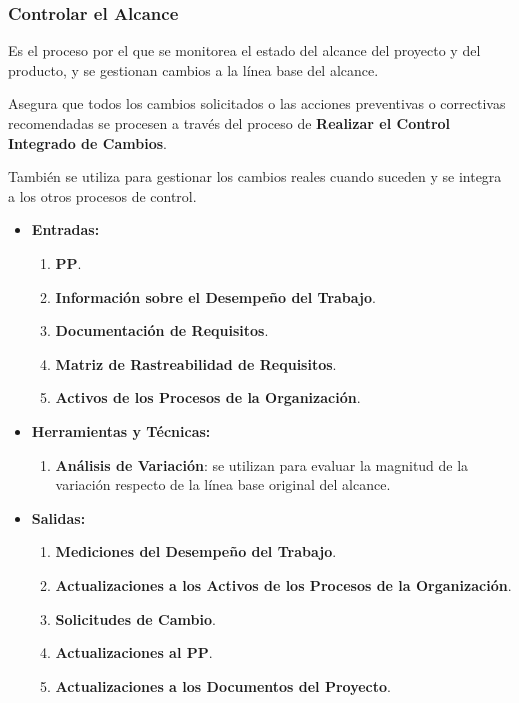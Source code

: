 \documentclass[10pt,a4paper]{article}
\begin{document}
\subsubsection{Controlar el Alcance}

Es el proceso por el que se monitorea el estado del alcance del proyecto y del producto, y se gestionan cambios a la línea base del alcance.

Asegura que todos los cambios solicitados o las acciones preventivas o correctivas recomendadas se procesen a través del proceso de \textbf{Realizar el Control Integrado de Cambios}.

También se utiliza para gestionar los cambios reales cuando suceden y se integra a los otros procesos de control.

\begin{itemize}
\item \textbf{Entradas:}
\begin{enumerate}
\item \textbf{PP}.
\item \textbf{Información sobre el Desempeño del Trabajo}.
\item \textbf{Documentación de Requisitos}.
\item \textbf{Matriz de Rastreabilidad de Requisitos}.
\item \textbf{Activos de los Procesos de la Organización}.
\end{enumerate}

\item \textbf{Herramientas y Técnicas:}
\begin{enumerate}
\item \textbf{Análisis de Variación}: se utilizan para evaluar la magnitud
de la variación respecto de la línea base original del alcance.
\end{enumerate}

\item \textbf{Salidas:}
\begin{enumerate}
\item \textbf{Mediciones del Desempeño del Trabajo}.
\item \textbf{Actualizaciones a los Activos de los Procesos de la Organización}.
\item \textbf{Solicitudes de Cambio}.
\item \textbf{Actualizaciones al PP}.
\item \textbf{Actualizaciones a los Documentos del Proyecto}.
\end{enumerate}
\end{itemize}
\end{document}

